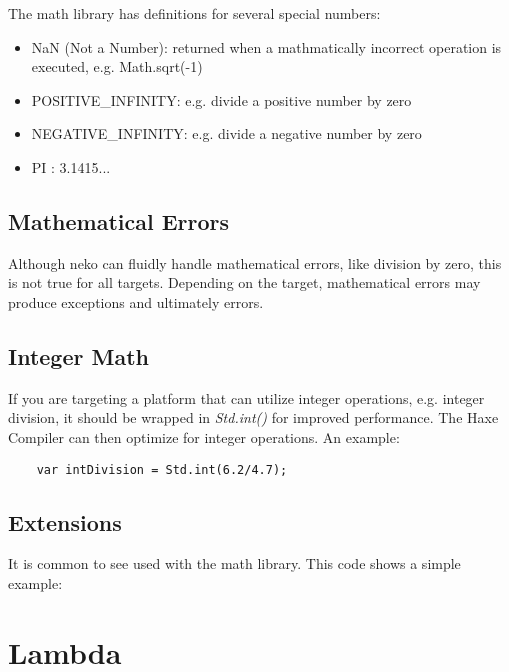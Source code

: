 The math library has definitions for several special numbers:

\begin{itemize}
	\item NaN (Not a Number): returned when a mathmatically incorrect operation is executed, e.g. Math.sqrt(-1)
	\item POSITIVE_INFINITY: e.g. divide a positive number by zero
	\item NEGATIVE_INFINITY: e.g. divide a negative number by zero
	\item PI : 3.1415...
\end{itemize}

\subsection{Mathematical Errors}
\label{std-math-mathematical-errors}
Although neko can fluidly handle mathematical errors, like division by zero, this is not true for all targets.  Depending on the target, mathematical errors may produce exceptions and ultimately errors.

\subsection{Integer Math}
\label{std-math-integer-math}

If you are targeting a platform that can utilize integer operations, e.g. integer division, it should be wrapped in \emph{Std.int()} for improved performance.  The Haxe Compiler can then optimize for integer operations.  An example:

\begin{lstlisting}
	var intDivision = Std.int(6.2/4.7);
\end{lstlisting}


\subsection{Extensions}
\label{std-math-extensions}
It is common to see  used with the math library.  This code shows a simple example:  


\section{Lambda}
\label{std-Lambda}

